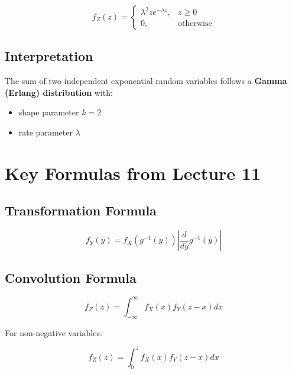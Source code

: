 \documentclass[12pt]{article}
\begin{document}
\[
f_Z(z)=
\begin{cases}
\lambda^2 z e^{-\lambda z}, & z \ge 0 \\
0, & \text{otherwise}
\end{cases}
\]

\subsection*{Interpretation}

The sum of two independent exponential random variables follows a \textbf{Gamma (Erlang) distribution} with:

\begin{itemize}
\item shape parameter $k = 2$
\item rate parameter $\lambda$
\end{itemize}

\section*{Key Formulas from Lecture 11}

\subsection*{Transformation Formula}

\[
f_Y(y) =
f_X(g^{-1}(y))
\left|
\frac{d}{dy} g^{-1}(y)
\right|
\]

\subsection*{Convolution Formula}

\[
f_Z(z) =
\int_{-\infty}^{\infty}
f_X(x)f_Y(z-x)dx
\]

For non-negative variables:

\[
f_Z(z) =
\int_0^z
f_X(x)f_Y(z-x)dx
\]
\end{document}
